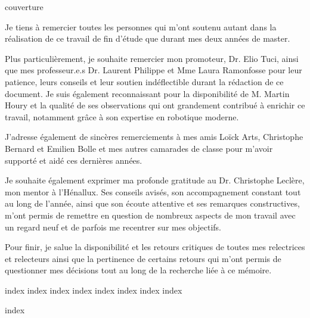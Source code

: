 \documentclass[12pt]{article}
\begin{document}
{couverture}

\thispagestyle{empty}\vspace*{\fill}%

Je tiens à remercier toutes les personnes qui m'ont soutenu autant dans la réalisation de ce travail de fin d'étude que durant mes deux années de master.

Plus particulièrement, je souhaite remercier mon promoteur, Dr. Elio Tuci, ainsi que mes professeur.e.s Dr. Laurent Philippe et Mme Laura Ramonfosse pour leur patience, leurs conseils et leur soutien indéflectible durant la rédaction de ce document.
Je suis également reconnaissant pour la disponibilité de M. Martin Houry et la qualité de ses observations qui ont grandement contribué à enrichir ce travail, notamment grâce à son expertise en robotique moderne.

J'adresse également de sincères remerciements à mes amis Loïck Arts, Christophe Bernard et Emilien Bolle et mes autres camarades de classe pour m'avoir supporté et aidé ces dernières années.

Je souhaite également exprimer ma profonde gratitude au Dr. Christophe Leclère, mon mentor à l’Hénallux.
Ses conseils avisés, son accompagnement constant tout au long de l’année, ainsi que son écoute attentive et ses remarques constructives, m’ont permis de remettre en question de nombreux aspects de mon travail avec un regard neuf et de parfois me recentrer sur mes objectifs.

Pour finir, je salue la disponibilité et les retours critiques de toutes mes relectrices et relecteurs ainsi que la pertinence de certains retours qui m'ont permis de questionner mes décisions tout au long de la recherche liée à ce mémoire.
%
\vfill\cleardoublepage%

\tableofcontents
\listoffigures
\listoftables
\printglossaries %
\vfill\cleardoublepage%

{index}
{index}
{index}
{index}
{index}
{index}
{index}
{index}

\printbibliography[title={Bibliographie},heading=bibnumbered,prenote={bib-intro}]

{index}
\end{document}
